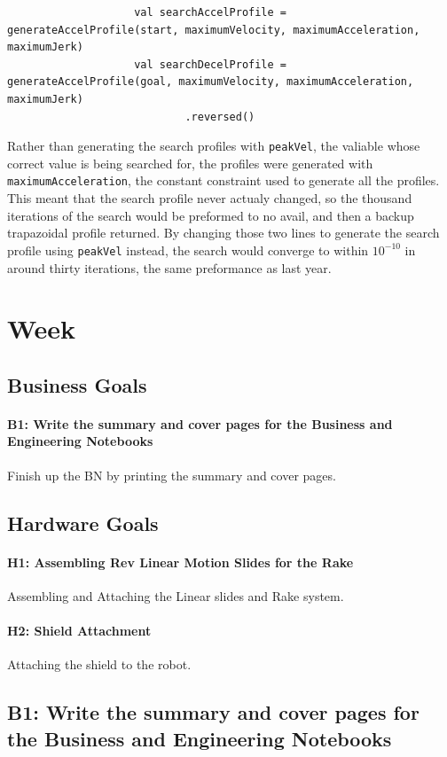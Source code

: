 \documentclass{article}
\begin{document}
\begin{lstlisting}
                    val searchAccelProfile = generateAccelProfile(start, maximumVelocity, maximumAcceleration, maximumJerk)
                    val searchDecelProfile = generateAccelProfile(goal, maximumVelocity, maximumAcceleration, maximumJerk)
                            .reversed()
\end{lstlisting}

Rather than generating the search profiles with \texttt{peakVel}, the valiable whose correct value is being searched for, the profiles were generated with \texttt{maximumAcceleration}, the constant constraint used to generate all the profiles. This meant that the search profile never actualy changed, so the thousand iterations of the search would be preformed to no avail, and then a backup trapazoidal profile returned. By changing those two  lines to generate the search profile using \texttt{peakVel} instead, the search would converge to within $10^{-10}$ in around thirty iterations, the same preformance as last year. 

\clearpage \newpage \section{Week \thesection} 
\subsection{Business Goals}
\paragraph{B1: Write the summary and cover pages for the Business and Engineering Notebooks}
 Finish up the BN by printing the summary and cover pages.
\subsection{Hardware Goals}
\paragraph{H1: Assembling Rev Linear Motion Slides for the Rake}
 Assembling and Attaching the Linear slides and Rake system.
\paragraph{H2: Shield Attachment}
Attaching the shield to the robot.
\newpage
\subsection{B1: Write the summary and cover pages for the Business and Engineering Notebooks}
\end{document}
